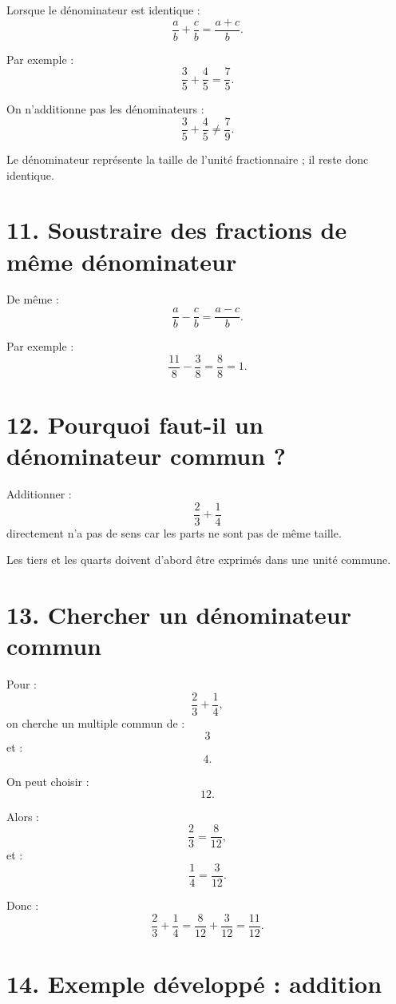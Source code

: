 Lorsque le dénominateur est identique :
\[
\dfrac ab+\dfrac cb
=
\dfrac{a+c}{b}.
\]

Par exemple :
\[
\dfrac35+\dfrac45
=
\dfrac75.
\]

\begin{attention}
On n'additionne pas les dénominateurs :
\[
\dfrac35+\dfrac45\neq\dfrac79.
\]
\end{attention}

Le dénominateur représente la taille de l'unité fractionnaire ; il reste donc identique.

\section{11. Soustraire des fractions de même dénominateur}

De même :
\[
\dfrac ab-\dfrac cb
=
\dfrac{a-c}{b}.
\]

Par exemple :
\[
\dfrac{11}{8}-\dfrac38
=
\dfrac88
=
1.
\]

\section{12. Pourquoi faut-il un dénominateur commun ?}

Additionner :
\[
\dfrac23+\dfrac14
\]
directement n'a pas de sens car les parts ne sont pas de même taille.

Les tiers et les quarts doivent d'abord être exprimés dans une unité commune.


\section{13. Chercher un dénominateur commun}

Pour :
\[
\dfrac23+\dfrac14,
\]
on cherche un multiple commun de :
\[
3
\]
et :
\[
4.
\]

On peut choisir :
\[
12.
\]

Alors :
\[
\dfrac23
=
\dfrac8{12},
\]
et :
\[
\dfrac14
=
\dfrac3{12}.
\]

Donc :
\[
\dfrac23+\dfrac14
=
\dfrac8{12}+\dfrac3{12}
=
\dfrac{11}{12}.
\]

\section{14. Exemple développé : addition}


